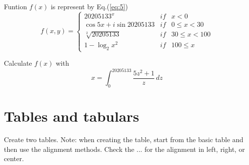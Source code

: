 \documentclass{article}
\begin{document}
		Funtion $f(x)$ is represent by Eq.(\ref{eq:5})
		\begin{equation}
			f(x,y) = 
			\left \{
			\begin{array}{ccl}
				20205133^{x} & if & x<0 \\
				\cos{5x} + i\sin{20205133} & if & 0 \leq x < 30\\
				\sqrt[2]{20205133} & if & 30 \leq x < 100 \\
				1 - \log_2 x^2 & if & 100 \leq x
			\end{array}
			\right .
		\label{eq:5}
		\end{equation}
		
		Calculate $f(x)$ with
		\begin{displaymath}
			x = \int_{0}^{20205133} \frac{5z^2 + 1}{z} \,dz
		\end{displaymath}
		
	\section{Tables and tabulars}
	\label{sec:tab}
		Create two tables. Note: when creating the table, start from the basic table and then use the alignment methods. Check the ... for the alignment in left, right, or center.
		
\end{document}
